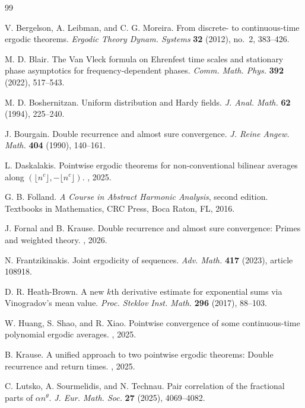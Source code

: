 \documentclass[reqno,12pt]{amsart}
\numberwithin{equation}{section}
\begin{document}
\begin{thebibliography}{99}

V. Bergelson, A. Leibman, and C. G. Moreira.
\newblock From discrete- to continuous-time ergodic theorems.
\newblock \emph{Ergodic Theory Dynam. Systems} \textbf{32} (2012), no.~2, 383--426.

M. D. Blair.
\newblock The Van Vleck formula on Ehrenfest time scales and stationary
  phase asymptotics for frequency-dependent phases.
\newblock \emph{Comm. Math. Phys.} \textbf{392} (2022), 517--543.

M. D. Boshernitzan.
\newblock Uniform distribution and Hardy fields.
\newblock \emph{J. Anal. Math.} \textbf{62} (1994), 225--240.

J. Bourgain.
\newblock Double recurrence and almost sure convergence.
\newblock \emph{J. Reine Angew. Math.} \textbf{404} (1990), 140--161.

L. Daskalakis.
\newblock Pointwise ergodic theorems for non-conventional bilinear averages
  along {$(\lfloor n^c\rfloor,\allowbreak-\lfloor n^c\rfloor)$}.
, 2025.

G. B. Folland.
\newblock \emph{A Course in Abstract Harmonic Analysis}, second edition.
\newblock Textbooks in Mathematics, CRC Press, Boca Raton, FL, 2016.

J. Fornal and B. Krause.
\newblock Double recurrence and almost sure convergence: Primes and weighted
  theory.
, 2026.

N. Frantzikinakis.
\newblock Joint ergodicity of sequences.
\newblock \emph{Adv. Math.} \textbf{417} (2023), article 108918.

D. R. Heath-Brown.
\newblock A new $k$th derivative estimate for exponential sums via
  Vinogradov's mean value.
\newblock \emph{Proc. Steklov Inst. Math.} \textbf{296} (2017), 88--103.

W. Huang, S. Shao, and R. Xiao.
\newblock Pointwise convergence of some continuous-time polynomial ergodic
  averages.
, 2025.

B. Krause.
\newblock A unified approach to two pointwise ergodic theorems: Double
  recurrence and return times.
, 2025.

C. Lutsko, A. Sourmelidis, and N. Technau.
\newblock Pair correlation of the fractional parts of $\alpha n^\theta$.
\newblock \emph{J. Eur. Math. Soc.} \textbf{27} (2025), 4069--4082.

\end{thebibliography}
\end{document}
